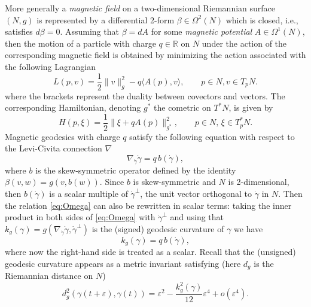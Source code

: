 \documentclass{amsart}
\theoremstyle{plain}
\theoremstyle{definition}
\theoremstyle{remark}
\newcommand{\R}{\mathbb{R}}
\newcommand{\eps}{\varepsilon}
\begin{document}
\smallskip
More generally a \emph{magnetic field} on a two-dimensional Riemannian surface $(N,g)$ is represented by a differential 2-form $\beta\in \Omega^{2}(N)$ which is closed, i.e., satisfies $d\beta=0$.
Assuming that $\beta=dA$ for some \emph{magnetic potential} $A\in \Omega^{1}(N)$, then the motion of a particle with charge $q\in \R$ on $N$ under the action of the corresponding magnetic field is obtained by minimizing the action associated with the following Lagrangian 
\begin{equation}
\label{eq:lagrintro}
L(p,v)=\frac{1}{2}\|v\|^{2}_{g}-  q\langle A(p), v\rangle,\qquad p\in N, v\in T_{p}N.
\end{equation}
 where the brackets represent the duality between covectors and vectors. The corresponding Hamiltonian, denoting $g^{*}$ the cometric on $T^{*}N$,  is given by
 \begin{equation}
\label{eq:Ham0}
H(p,\xi)=\frac{1}{2}\| \xi+qA(p)\|^{2}_{g^{*}},\qquad p\in N,\, \xi \in T^{*}_{p}N.
\end{equation}
Magnetic geodesics with charge $q$ satisfy the following equation with respect to the Levi-Civita connection $\nabla$
\begin{equation}\label{eq:Omega}
\nabla_{\dot \gamma}\dot \gamma= q\, b(\dot \gamma),
\end{equation}
where $b$ is the skew-symmetric operator defined by the identity $\beta(v,w)=g(v,b(w))$. 
Since $b$ is skew-symmetric and $N$ is 2-dimensional, then $b(\dot \gamma)$ is a scalar multiple of $\dot \gamma^{\perp}$, the unit vector orthogonal to $\dot \gamma$ in $N$. Then the relation \eqref{eq:Omega} can also be rewritten in scalar terms:  taking the inner product in both sides of \eqref{eq:Omega} with $\dot \gamma^{\perp}$ and using that $k_{g}(\gamma)=g(\nabla_{\dot \gamma}\dot \gamma,\dot \gamma^{\perp})$ is the (signed) geodesic curvature of $\gamma$ we have
\begin{equation}\label{eq:Omega2}
k_{g}(\gamma)= q\, b(\dot \gamma),
\end{equation}
where now the right-hand side is treated as a scalar.  Recall that the  (unsigned) geodesic curvature appears as a metric invariant satisfying (here $d_{g}$ is the Riemannian distance on $N$)
 \begin{equation}\label{eq:db16}
d_{g}^{2}(\gamma(t+\eps),\gamma(t))=\eps^{2}-\frac{k^{2}_{g}(\gamma)}{12}\eps^{4}+o(\eps^{4}).
\end{equation}
\end{document}

